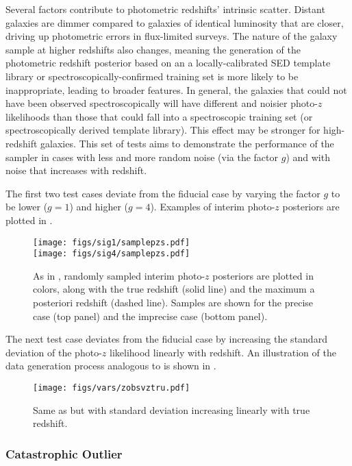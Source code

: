 Several factors contribute to photometric redshifts' intrinsic scatter.  
Distant galaxies are dimmer compared to galaxies of identical luminosity that are closer, driving up photometric errors in flux-limited surveys.  
The nature of the galaxy sample at higher redshifts also changes, meaning the generation of the photometric redshift posterior based on an a locally-calibrated SED template library or spectroscopically-confirmed training set is more likely to be inappropriate, leading to broader features.  
In general, the galaxies that could not have been observed spectroscopically will have different and noisier photo-$z$ likelihoods than those that could fall into a spectroscopic training set (or spectroscopically derived template library).  
This effect may be stronger for high-redshift galaxies.  
This set of tests aims to demonstrate the performance of the sampler in cases with less and more random noise (via the factor $g$) and with noise that increases with redshift.

The first two test cases deviate from the fiducial case by varying the factor $g$ to be lower ($g=1$) and higher ($g=4$).  
Examples of interim photo-$z$ posteriors are plotted in .

\begin{figure}
	\texttt{[image: figs/sig1/samplepzs.pdf]}\\
	\texttt{[image: figs/sig4/samplepzs.pdf]}
	\caption{As in , randomly sampled interim photo-$z$ posteriors are plotted in colors, along with the true redshift (solid line) and the maximum a posteriori redshift (dashed line).  
		Samples are shown for the precise case (top panel) and the imprecise case (bottom panel).}
\end{figure}

The next test case deviates from the fiducial case by increasing the standard deviation of the photo-$z$ likelihood linearly with redshift. 
An illustration of the data generation process analogous to  is shown in .

\begin{figure}
	\texttt{[image: figs/vars/zobsvztru.pdf]}
	\caption{Same as  but with standard deviation increasing linearly with true redshift.}
\end{figure}

\subsubsection{Catastrophic Outlier}

